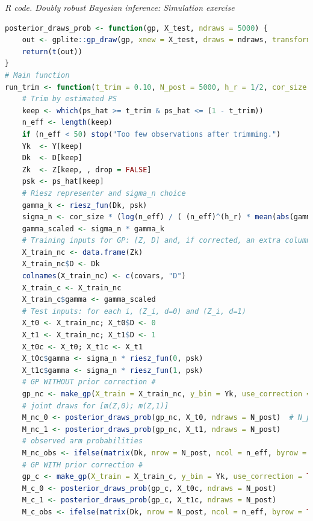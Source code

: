 \begin{tcolorbox}[enhanced,width=4.67in,center upper,
	fontupper=\large\bfseries,drop shadow southwest,sharp corners]
	\textit{R code. Doubly robust Bayesian inference: Simulation exercise}
	\begin{VF}
		\begin{lstlisting}[language=R]	
posterior_draws_prob <- function(gp, X_test, ndraws = 5000) {
	out <- gplite::gp_draw(gp, xnew = X_test, draws = ndraws, transform = TRUE, target = FALSE, jitter = 1e-6)
	return(t(out))
}
# Main function
run_trim <- function(t_trim = 0.10, N_post = 5000, h_r = 1/2, cor_size = 1) {
	# Trim by estimated PS
	keep <- which(ps_hat >= t_trim & ps_hat <= (1 - t_trim))
	n_eff <- length(keep)
	if (n_eff < 50) stop("Too few observations after trimming.")
	Yk  <- Y[keep]
	Dk  <- D[keep]
	Zk  <- Z[keep, , drop = FALSE]
	psk <- ps_hat[keep]
	# Riesz representer and sigma_n choice
	gamma_k <- riesz_fun(Dk, psk)
	sigma_n <- cor_size * (log(n_eff) / ( (n_eff)^(h_r) * mean(abs(gamma_k)) ))
	gamma_scaled <- sigma_n * gamma_k
	# Training inputs for GP: [Z, D] and, if corrected, an extra column 'gamma'
	X_train_nc <- data.frame(Zk)
	X_train_nc$D <- Dk
	colnames(X_train_nc) <- c(covars, "D")
	X_train_c <- X_train_nc
	X_train_c$gamma <- gamma_scaled
	# Test inputs: for each i, (Z_i, d=0) and (Z_i, d=1)
	X_t0 <- X_train_nc; X_t0$D <- 0
	X_t1 <- X_train_nc; X_t1$D <- 1
	X_t0c <- X_t0; X_t1c <- X_t1
	X_t0c$gamma <- sigma_n * riesz_fun(0, psk)   
	X_t1c$gamma <- sigma_n * riesz_fun(1, psk) 
	# GP WITHOUT prior correction #
	gp_nc <- make_gp(X_train = X_train_nc, y_bin = Yk, use_correction = FALSE)
	# joint draws for [m(Z,0); m(Z,1)]
	M_nc_0 <- posterior_draws_prob(gp_nc, X_t0, ndraws = N_post)  # N_post x n_eff
	M_nc_1 <- posterior_draws_prob(gp_nc, X_t1, ndraws = N_post)
	# observed arm probabilities
	M_nc_obs <- ifelse(matrix(Dk, nrow = N_post, ncol = n_eff, byrow = TRUE) == 1, M_nc_1, M_nc_0)
	# GP WITH prior correction #
	gp_c <- make_gp(X_train = X_train_c, y_bin = Yk, use_correction = TRUE, gamma_scaled = gamma_scaled)
	M_c_0 <- posterior_draws_prob(gp_c, X_t0c, ndraws = N_post)
	M_c_1 <- posterior_draws_prob(gp_c, X_t1c, ndraws = N_post)
	M_c_obs <- ifelse(matrix(Dk, nrow = N_post, ncol = n_eff, byrow = TRUE) == 1, M_c_1, M_c_0)
\end{lstlisting}
	\end{VF}
\end{tcolorbox} 


